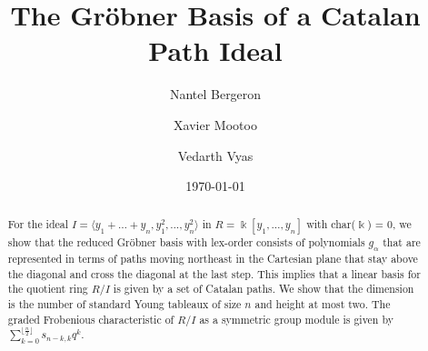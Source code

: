 \documentclass[12pt,reqno]{amsart}
\date{\today}
\author{Nantel Bergeron}\address[Bergeron]
\author{Xavier Mootoo}\address[Mootoo]
\author{Vedarth Vyas}\address[Vyas]
\title[{G}r\"obner Basis of a Catalan Path Ideal]{{T}he Gr\"obner Basis of a Catalan Path Ideal}
\theoremstyle{plain}
\theoremstyle{definition}
\def\field{\Bbbk}
\begin{document}
\begin{abstract}
	For the ideal $I = \langle y_1 +  \dots + y_n, y^2_1, \dots , y^2_n \rangle$ in $R = \field[y_1, \dots , y_n]$ 
	 with char($\field$) = 0, we show that the reduced Gr\"obner basis with lex-order consists of polynomials $g_\alpha$ that are
	represented in terms of paths moving northeast in the Cartesian plane that stay above the diagonal 
	and cross the diagonal at the last step.  This implies that a linear basis for the quotient ring $R/I$ is given by a set of Catalan paths. We show that the dimension 
	is the number of standard Young tableaux of size $n$ and height at most two. The graded Frobenious characteristic of $R/I$ as a symmetric group module is given by 
	$\sum_{k=0}^{\lfloor \frac{n}{2} \rfloor } s_{n-k,k}q^k$.
\end{abstract} 

\maketitle

\end{document}
